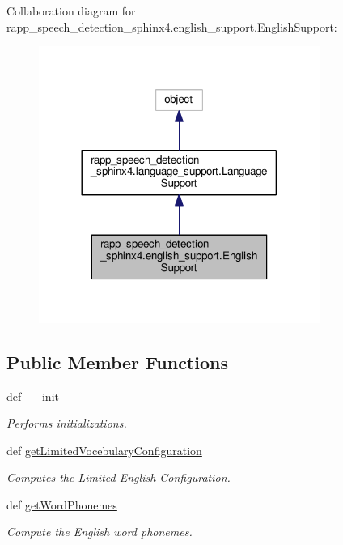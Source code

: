 Collaboration diagram for rapp\-\_\-speech\-\_\-detection\-\_\-sphinx4.\-english\-\_\-support.\-English\-Support\-:
\nopagebreak
\begin{figure}[H]
\begin{center}
\leavevmode
\includegraphics[width=260pt]{classrapp__speech__detection__sphinx4_1_1english__support_1_1EnglishSupport__coll__graph}
\end{center}
\end{figure}
\subsection*{Public Member Functions}
\begin{DoxyCompactItemize}
\item 
def \hyperlink{classrapp__speech__detection__sphinx4_1_1english__support_1_1EnglishSupport_a399297def83e8843368fb4a1d3ca526b}{\-\_\-\-\_\-init\-\_\-\-\_\-}
\begin{DoxyCompactList}\small\item\em Performs initializations. \end{DoxyCompactList}\item 
def \hyperlink{classrapp__speech__detection__sphinx4_1_1english__support_1_1EnglishSupport_aee8fe0bceba35b725d6cf04ab7213016}{get\-Limited\-Vocebulary\-Configuration}
\begin{DoxyCompactList}\small\item\em Computes the Limited English Configuration. \end{DoxyCompactList}\item 
def \hyperlink{classrapp__speech__detection__sphinx4_1_1english__support_1_1EnglishSupport_a6b2a2e85a48b8c2887facecdb42ae251}{get\-Word\-Phonemes}
\begin{DoxyCompactList}\small\item\em Compute the English word phonemes. \end{DoxyCompactList}\end{DoxyCompactItemize}
